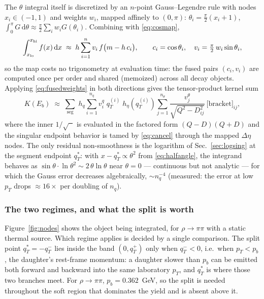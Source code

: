 \documentclass[11pt]{article}
\begin{document}
The $\theta$ integral itself is discretized by an $n$-point
Gauss--Legendre rule with nodes $x_i\in(-1,1)$ and weights $w_i$, mapped
affinely to $(0,\pi)$: $\theta_i=\tfrac\pi2(x_i+1)$,
$\int_0^\pi G\,\mathrm{d}\theta\approx\tfrac\pi2\sum_iw_iG(\theta_i)$.
Combining with \eqref{eq:cosmap},
\begin{equation}
\int_{x_{\rm lo}}^{x_{\rm hi}}f(x)\,\mathrm{d}x
\;\approx\;
h\sum_{i=1}^{n} v_i\, f\big(m-h\,c_i\big),
\qquad
c_i=\cos\theta_i,\quad
v_i=\tfrac{\pi}{2}\,w_i\sin\theta_i ,
\label{eq:fusedweights}
\end{equation}
so the map costs no trigonometry at evaluation time: the fused pairs
$(c_i,v_i)$ are computed once per order and shared (memoized) across all
decay objects.  Applying \eqref{eq:fusedweights} in both directions gives
the tensor-product kernel sum
\begin{equation}
K(E_b)\;\approx\;
\sum_{\text{seg}}\;h_q\sum_{i=1}^{n_q} v^{q}_{i}\;q_T^{(i)}\;
h_\eta\!\left(q_T^{(i)}\right)\sum_{j=1}^{n_\theta} \frac{v^{\theta}_{j}}
{\sqrt{Q^{2}-D_{ij}^{2}}}\,\big[\text{bracket}\big]_{ij},
\label{eq:tensor}
\end{equation}
where the inner $1/\sqrt{\phantom{x}}$ is evaluated in the factored form
$(Q-D)(Q+D)$ and the singular endpoint behavior is tamed by
\eqref{eq:cancel} through the mapped $\Delta\eta$ nodes.  The only
residual non-smoothness is the logarithm of Sec.~\ref{sec:logsing} at the
segment endpoint $q_T^{*}$: with $x-q_T^{*}\propto\theta^{2}$ from
\eqref{eq:halfangle}, the integrand behaves as
$\sin\theta\cdot\ln\theta^{2}\sim2\,\theta\ln\theta$ near $\theta=0$ ---
continuous but not analytic --- for which the Gauss error decreases
algebraically, $\sim n_q^{-4}$ (measured: the error at low $p_T$ drops
$\approx16\times$ per doubling of $n_q$).

\subsubsection{The two regimes, and what the split is worth}
\label{sec:segment-figure}

Figure~\ref{fig:nodes} shows the object being integrated, for
$\rho\to\pi\pi$ with a static thermal source.  Which regime applies is decided
by a single comparison.  The split point $q_T^{*}=-q_T^{-}$ lies inside the
band $(0,q_T^{+})$ only when $q_T^{-}<0$, i.e.\ when $p_T<p_b$, the daughter's
rest-frame momentum: a daughter slower than $p_b$ can be emitted both forward
and backward into the same laboratory $p_T$, and $q_T^{*}$ is where those two
branches meet.  For $\rho\to\pi\pi$, $p_b=0.362$~GeV, so the split is needed
throughout the soft region that dominates the yield and is absent above it.
\end{document}
